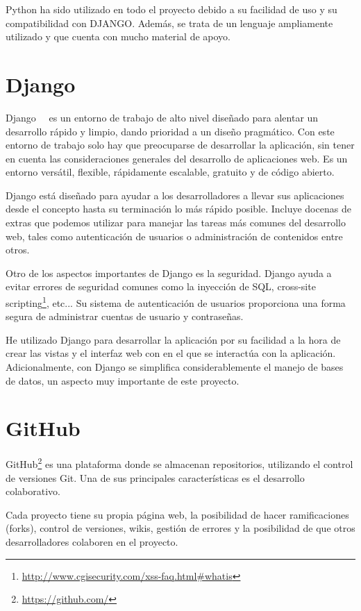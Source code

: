 \documentclass[a4paper, 12pt]{book}
\begin{document}
Python ha sido utilizado en todo el proyecto debido a su facilidad de uso y su compatibilidad con DJANGO. Además, se trata de un lenguaje ampliamente utilizado y que cuenta con mucho material de apoyo.

\section{Django} 
\label{sec:seccion3}
Django~\cite{django:_django}~\cite{bennet:_django} es un entorno de trabajo de alto nivel diseñado para alentar un desarrollo rápido y limpio, dando prioridad a un diseño pragmático. Con este entorno de trabajo solo hay que preocuparse de desarrollar la aplicación, sin tener en cuenta las consideraciones generales del desarrollo de aplicaciones web. Es un entorno versátil, flexible, rápidamente escalable, gratuito y de código abierto.

Django está diseñado para ayudar a los desarrolladores a llevar sus aplicaciones desde el concepto hasta su terminación lo más rápido posible. Incluye docenas de extras que podemos utilizar para manejar las tareas más comunes del desarrollo web, tales como autenticación de usuarios o administración de contenidos entre otros.

Otro de los aspectos importantes de Django es la seguridad. Django ayuda a evitar errores de seguridad comunes como la inyección de SQL, cross-site scripting\footnote{\url{http://www.cgisecurity.com/xss-faq.html#whatis}}, etc... Su sistema de autenticación de usuarios proporciona una forma segura de administrar cuentas de usuario y contraseñas.

He utilizado Django para desarrollar la aplicación por su facilidad a la hora de crear las vistas y el interfaz web con en el que se interactúa con la aplicación. Adicionalmente, con Django se simplifica considerablemente el manejo de bases de datos, un aspecto muy importante de este proyecto.

\section{GitHub} 
\label{sec:seccion4}
GitHub\footnote{\url{https://github.com/}} es una plataforma donde se almacenan repositorios, utilizando el control de versiones Git. Una de sus principales características es el desarrollo colaborativo. 

Cada proyecto tiene su propia página web, la posibilidad de hacer ramificaciones (forks), control de versiones, wikis, gestión de errores y la posibilidad de que otros desarrolladores colaboren en el proyecto.
\end{document}
